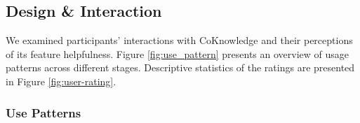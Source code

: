 


\subsection{Design \& Interaction}
\label{sec:interaction}
We examined participants' interactions with CoKnowledge and their perceptions of its feature helpfulness. Figure \ref{fig:use_pattern} presents an overview of usage patterns across different stages. Descriptive statistics of the ratings are presented in Figure \ref{fig:user-rating}.

\subsubsection{Use Patterns}
\label{sec:use-parttern}

